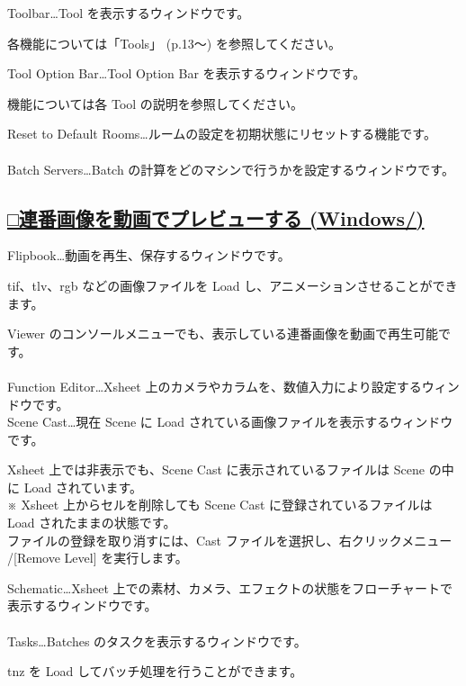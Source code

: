 \documentclass[a4paper,10pt]{article}
\begin{document}
\normalsize
\noindent Toolbar…Tool を表示するウィンドウです。\par
\footnotesize
\noindent 各機能については「Tools」 (p.13～) を参照してください。\\[-0.5em]
\par
\normalsize
\noindent Tool Option Bar…Tool Option Bar を表示するウィンドウです。\par
\footnotesize
\noindent 機能については各 Tool の説明を参照してください。\\[-0.5em]
\par
\normalsize
\noindent Reset to Default Rooms…ルームの設定を初期状態にリセットする機能です。\\[-0.5em]
\\
Batch Servers…Batch の計算をどのマシンで行うかを設定するウィンドウです。

\newpage

\subsection*{\uline{□連番画像を動画でプレビューする (Windows/)}}

\normalsize
\noindent Flipbook…動画を再生、保存するウィンドウです。\par
\footnotesize
\noindent tif、tlv、rgb などの画像ファイルを Load し、アニメーションさせることができます。\\
\par
\normalsize
\noindent Viewer のコンソールメニューでも、表示している連番画像を動画で再生可能です。\\
\\
Function Editor…Xsheet 上のカメラやカラムを、数値入力により設定するウィンドウです。\\[1em]
Scene Cast…現在 Scene に Load されている画像ファイルを表示するウィンドウです。\par
\footnotesize
\noindent Xsheet 上では非表示でも、Scene Cast に表示されているファイルは Scene の中に Load されています。\\
※ Xsheet 上からセルを削除しても Scene Cast に登録されているファイルは Load されたままの状態です。\\
ファイルの登録を取り消すには、Cast ファイルを選択し、右クリックメニュー /[Remove Level] を実行します。\\
\par
\normalsize
\noindent Schematic…Xsheet 上での素材、カメラ、エフェクトの状態をフローチャートで表示するウィンドウです。\\
\\
Tasks…Batches のタスクを表示するウィンドウです。\par
\footnotesize
\noindent tnz を Load してバッチ処理を行うことができます。\\
\\
\end{document}
